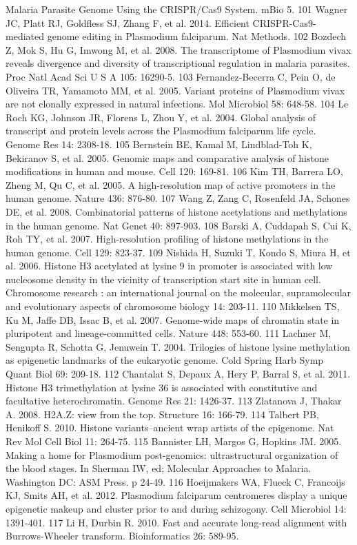 Malaria Parasite Genome Using the CRISPR/Cas9 System. mBio 5.
101 Wagner JC, Platt RJ, Goldfless SJ, Zhang F, et al. 2014. Efficient
CRISPR-Cas9-mediated genome editing in Plasmodium falciparum. Nat Methods.
102 Bozdech Z, Mok S, Hu G, Imwong M, et al. 2008. The transcriptome of
Plasmodium vivax reveals divergence and diversity of transcriptional
regulation in malaria parasites. Proc Natl Acad Sci U S A 105: 16290-5.
103 Fernandez-Becerra C, Pein O, de Oliveira TR, Yamamoto MM, et al. 2005.
Variant proteins of Plasmodium vivax are not clonally expressed in natural
infections. Mol Microbiol 58: 648-58.
104 Le Roch KG, Johnson JR, Florens L, Zhou Y, et al. 2004. Global analysis of
transcript and protein levels across the Plasmodium falciparum life cycle.
Genome Res 14: 2308-18.
105 Bernstein BE, Kamal M, Lindblad-Toh K, Bekiranov S, et al. 2005. Genomic
maps and comparative analysis of histone modifications in human and mouse.
Cell 120: 169-81.
106 Kim TH, Barrera LO, Zheng M, Qu C, et al. 2005. A high-resolution map of
active promoters in the human genome. Nature 436: 876-80.
107 Wang Z, Zang C, Rosenfeld JA, Schones DE, et al. 2008. Combinatorial
patterns of histone acetylations and methylations in the human genome. Nat
Genet 40: 897-903.
108 Barski A, Cuddapah S, Cui K, Roh TY, et al. 2007. High-resolution
profiling of histone methylations in the human genome. Cell 129: 823-37.
109 Nishida H, Suzuki T, Kondo S, Miura H, et al. 2006. Histone H3 acetylated
at lysine 9 in promoter is associated with low nucleosome density in the
vicinity of transcription start site in human cell. Chromosome research : an
international journal on the molecular, supramolecular and evolutionary
aspects of chromosome biology 14: 203-11.
110 Mikkelsen TS, Ku M, Jaffe DB, Issac B, et al. 2007. Genome-wide maps of
chromatin state in pluripotent and lineage-committed cells. Nature 448:
553-60.
111 Lachner M, Sengupta R, Schotta G, Jenuwein T. 2004. Trilogies of histone
lysine methylation as epigenetic landmarks of the eukaryotic genome. Cold
Spring Harb Symp Quant Biol 69: 209-18.
112 Chantalat S, Depaux A, Hery P, Barral S, et al. 2011. Histone H3
trimethylation at lysine 36 is associated with constitutive and facultative
heterochromatin. Genome Res 21: 1426-37.
113 Zlatanova J, Thakar A. 2008. H2A.Z: view from the top. Structure 16:
166-79.
114 Talbert PB, Henikoff S. 2010. Histone variants--ancient wrap artists of
the epigenome. Nat Rev Mol Cell Biol 11: 264-75.
115 Bannister LH, Margos G, Hopkins JM. 2005. Making a home for Plasmodium
post-genomics: ultrastructural organization of the blood stages. In Sherman
IW, ed; Molecular Approaches to Malaria. Washington DC: ASM Press. p 24-49.
116 Hoeijmakers WA, Flueck C, Francoijs KJ, Smits AH, et al. 2012. Plasmodium
falciparum centromeres display a unique epigenetic makeup and cluster prior to
and during schizogony. Cell Microbiol 14: 1391-401.
117 Li H, Durbin R. 2010. Fast and accurate long-read alignment with
Burrows-Wheeler transform. Bioinformatics 26: 589-95.



